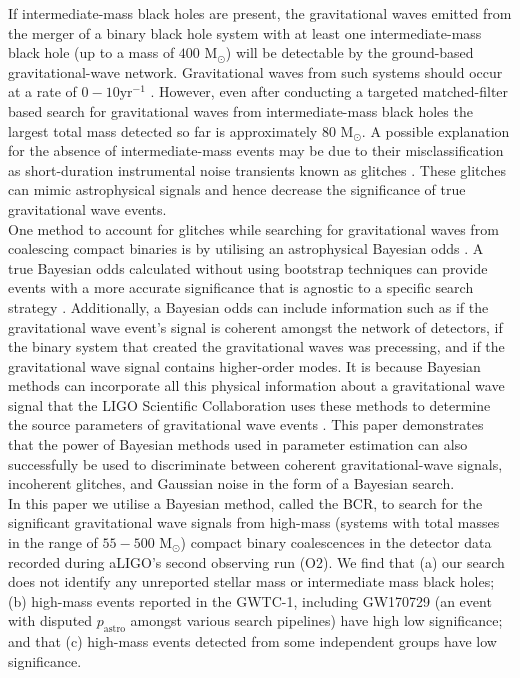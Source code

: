 \documentclass[%
preprint,
 amsmath,amssymb,
 aps,
]{revtex4}
\newcommand{\bcr}{{\sc BCR}\xspace}
\newcommand{\msun}{{\sc M${}_\odot$}\xspace}
\begin{document}
If intermediate-mass black holes are present, the gravitational waves emitted from the merger of a binary black hole system with at least one intermediate-mass black hole (up to a mass of $400$ \msun) will be detectable by the ground-based gravitational-wave network. Gravitational waves from such systems should occur at a rate of $0-10\text{yr}^{-1}$ \cite{fregeau2006imbhbRatePrediction, mandel2008rates,rodriguez2015bbhRatePredictions}.  However, even after conducting a targeted matched-filter based search for gravitational waves from intermediate-mass black holes the largest total mass detected so far is approximately $80$ \msun \cite{imbhbSearch2014, ligo_imbh_search, abbott2019gwtc}. A possible explanation for the absence of intermediate-mass events may be due to their misclassification as short-duration instrumental noise transients known as glitches \cite{glitch_in_fifth_ligo_run, bayeswave, improving_dq_in_early_runs, ligo_glitch_gw150914, pycbc_short_duration_transients, pe_with_glitch, blip_glitches}. These glitches can mimic astrophysical signals and hence decrease the significance of true gravitational wave events. \\

One method to account for glitches while searching for gravitational waves from coalescing compact binaries is by utilising an astrophysical Bayesian odds  \cite{bci, BCR1, BCR2, bcr_gw151216, bayesian_odds}. A true Bayesian odds calculated without using bootstrap techniques can provide events with a more accurate significance that is agnostic to a specific search strategy \cite{BCR2, bcr_gw151216,  bayesian_odds}. Additionally, a Bayesian odds can include information such as if the gravitational wave event's signal is coherent amongst the network of detectors, if the binary system that created the gravitational waves was precessing, and if the gravitational wave signal contains higher-order modes.  It is because Bayesian methods can incorporate all this physical information about a gravitational wave signal that the LIGO Scientific Collaboration uses these methods to determine the source parameters of gravitational wave events \cite{abbott2016ligo, abbott2019gwtc}. This paper demonstrates that the power of Bayesian methods used in parameter estimation can also successfully be used to discriminate between coherent gravitational-wave signals, incoherent glitches, and Gaussian noise in the form of a Bayesian search. \\

In this paper we utilise a Bayesian method, called the \bcr \cite{BCR1}, to search for the significant gravitational wave signals from high-mass (systems with total masses in the range of $55-500$ \msun) compact binary coalescences in the detector data recorded during aLIGO's second observing run (O2).  We find that (a) our search does not identify any unreported stellar mass or intermediate mass black holes; (b) high-mass events reported in the GWTC-1, including GW170729 (an event with disputed $p_\text{astro}$ amongst various search pipelines) have high low significance; and that (c) high-mass events detected from some independent groups have low significance. \\
\end{document}
